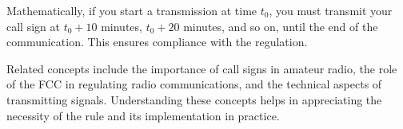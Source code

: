 Mathematically, if you start a transmission at time \( t_0 \), you must transmit your call sign at \( t_0 + 10 \) minutes, \( t_0 + 20 \) minutes, and so on, until the end of the communication. This ensures compliance with the regulation.

Related concepts include the importance of call signs in amateur radio, the role of the FCC in regulating radio communications, and the technical aspects of transmitting signals. Understanding these concepts helps in appreciating the necessity of the rule and its implementation in practice.

